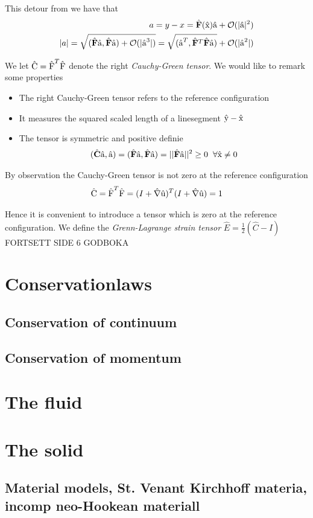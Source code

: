 This detour from \cite{Richter2016}  we have that 
\begin{align*}
a = y - x = \hat{F}(\ha{x})\ha{a} +  \mathcal{O}(|\ha{a} |^2) \\
|a| = \sqrt{ (\hat{F}\ha{a},\hat{F}\ha{a})+ \mathcal{O} (|\ha{a}^3|)  } = 
 \sqrt{ (\ha{a}^T, \hat{F}^T\hat{F}\ha{a})} + \mathcal{O} (|\ha{a}^2|)  
\end{align*}

We let $\text{\^{C}} = \text{\^{F}}^T \text{\^{F}}$ denote the right \textit{Cauchy-Green tensor}. We would like to remark some properties

\begin{itemize}
\item The right Cauchy-Green tensor refers to the reference configuration
\item It measures the squared scaled length of a linesegment $\text{\^{y}} - \text{\^{x}}$
\item The tensor is symmetric and positive definie
\begin{align*}
(\hat{C}\ha{a}, \ha{a}) = (\hat{F}\ha{a}, \hat{F}\ha{a}  ) = ||\hat{F} \ha{a} ||^2  \geq 0 \hspace{2mm} \forall \ha{x} \neq 0
\end{align*}
\end{itemize} 

By observation the Cauchy-Green tensor is not zero at the reference configuration 
\begin{align*}
\ha{C} =  \ha{F}^T \ha{F} = (I + \hat{\nabla} \ha{u})^T (I + \hat{\nabla} \ha{u}) = 1
\end{align*}

Hence it is convenient to introduce a tensor which is zero at the reference configuration. We define the \textit{Grenn-Lagrange strain tensor} 
$\hat{E} = \frac{1}{2}(\hat{C} - I) $ FORTSETT SIDE 6 GODBOKA
\section{Conservationlaws}
\subsection{Conservation of continuum}
\subsection{Conservation of momentum}

\section{The fluid}

\section{The solid}

\subsection{Material models, St. Venant Kirchhoff materia, incomp neo-Hookean materiall}



